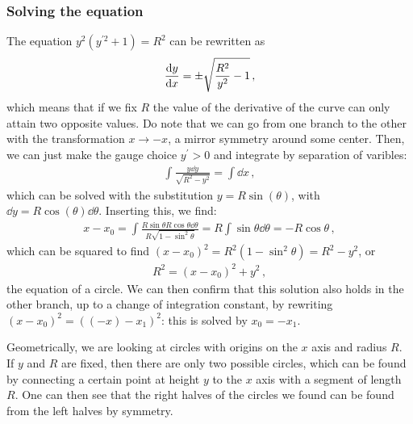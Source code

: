 \documentclass[main.tex]{subfiles}
\begin{document}

\subsubsection{Solving the equation}

The equation \(y^2 (y^{\prime 2}+1) = R^2\) can be rewritten as 
%
\begin{align}
  \dv{y}{x} = \pm \sqrt{\frac{R^2}{y^2} - 1}
\,,
\end{align}
%
which means that if we fix \(R\) the value of the derivative of the curve can only attain two opposite values. Do note that we can go from one branch to the other with the transformation \(x \rightarrow -x\), a mirror symmetry around some center.
Then, we can just make the gauge choice \(y^{\prime }>0\) and integrate by separation of varibles: 
%
\begin{align}
  \int \frac{y \dd{y}}{\sqrt{R^2-y^2}} = \int \dd{x}
\,,
\end{align}
%
which can be solved with the substitution \( y = R \sin(\theta )\), with \(\dd{y} = R \cos(\theta ) \dd{\theta }\). Inserting this, we find: 
%
\begin{align}
  x - x_0  = \int \frac{R \sin\theta R \cos\theta  \dd{\theta }}{R \sqrt{1 - \sin^2 \theta }} 
  = R \int \sin \theta  \dd{\theta } = - R \cos \theta 
\,,
\end{align}
%
which can be squared to find \((x- x_0 )^2 = R^2 (1 - \sin^2 \theta ) = R^2 - y^2\), or 
%
\begin{align}
  R^2 = (x-x_0  )^2 + y^2
\,,
\end{align}
%
the equation of a circle.
We can then confirm that this solution also holds in the other branch, up to a change of integration constant, by rewriting \((x- x_0 )^2 = ((-x) - x_1 )^2\): this is solved by \(x_0 = - x_1 \). 

Geometrically, we are looking at circles with origins on the \(x\) axis and radius \(R\). If \(y\) and \(R\) are fixed, then there are only two possible circles, which can be found by connecting a certain point at height \(y\) to the \(x\) axis with a segment of length \(R\).
One can then see that the right halves of the circles we found can be found from the left halves by symmetry.
\end{document}
